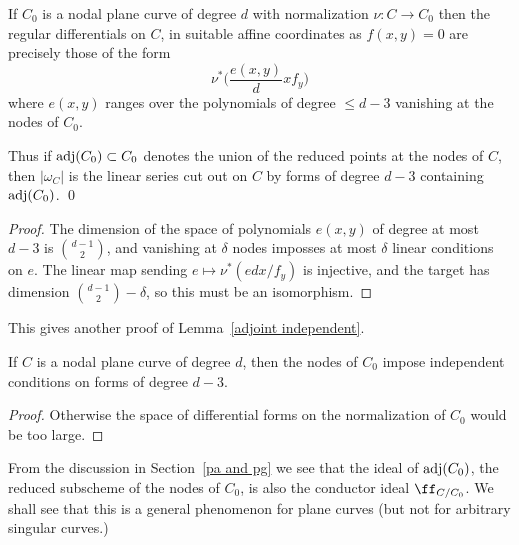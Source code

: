 \begin{theorem}\label{canonical from adjoint 1}
If $C_{0}$ is a nodal plane curve of degree $d$ with normalization $\nu: C\to C_{0}$
then the  regular differentials on  $C$, in suitable affine coordinates as $f(x,y) = 0$ 
 are precisely those of the form
 $$
\nu^{*}\biggl( \frac{e(x,y)}dx{f_{y}}\biggr)
$$
where 
$e(x,y)$ ranges over the polynomials of degree $\leq d-3$
vanishing at the nodes of $C_{0}.$

Thus if $\adj(C_{0})\subset C_{0}$ denotes the union
of the reduced points at the nodes of $C$, then $|\omega_{C}|$ is the linear series cut out on $C$ by 
forms of degree $d-3$ containing $\adj(C_{0})$.
\qed 
\end{theorem}

\begin{proof}
The dimension of the space of polynomials $e(x,y)$ of degree at most $d-3$ is $\binom{d-1}{2}$,
and vanishing at $\delta$ nodes imposses at most $\delta$ linear conditions on $e$. The linear map sending
$e\mapsto \nu^{*}(edx/f_{y})$ is injective, and the target has dimension 
$\binom{d-1}{2}-\delta$, so this must be an isomorphism.
\end{proof}


This gives another proof of Lemma~\ref{adjoint independent}.

\begin{corollary}
If $C$ is a nodal plane curve of degree $d$, then the nodes of $C_{0}$ impose independent
conditions on forms of degree $d-3$.
\end{corollary}
\begin{proof}
 Otherwise the space of differential forms on the normalization of $C_{0}$ would be too large.
\end{proof}

From the discussion in Section~\ref{pa and pg} we see that the ideal of $\adj(C_{0})$, the reduced subscheme
of the nodes of $C_{0}$, is also the conductor ideal $\ff_{C/C_{0}}$. We shall see that this is a general
phenomenon for plane curves (but not for arbitrary singular curves.)

%
%
%

